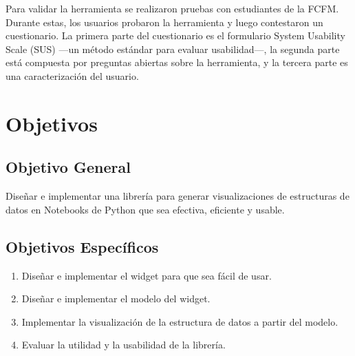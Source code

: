 Para validar la herramienta se realizaron pruebas con estudiantes de la FCFM. Durante estas, los usuarios probaron la herramienta y luego contestaron un cuestionario. La primera parte del cuestionario es el formulario System Usability Scale (SUS) ---un método estándar para evaluar usabilidad---, la segunda parte está compuesta por preguntas abiertas sobre la herramienta, y la tercera parte es una caracterización del usuario.

\section{Objetivos}

\subsection*{Objetivo General}\label{sec:obj-g}

Diseñar e implementar una librería para generar visualizaciones de estructuras de datos en Notebooks de Python que sea efectiva, eficiente y usable.

\subsection*{Objetivos Específicos}\label{sec:obj-e}

\begin{enumerate}
  \item Diseñar e implementar el widget para que sea fácil de usar.
  \item Diseñar e implementar el modelo del widget.
  \item Implementar la visualización de la estructura de datos a partir del modelo.
  \item Evaluar la utilidad y la usabilidad de la librería.
\end{enumerate}
